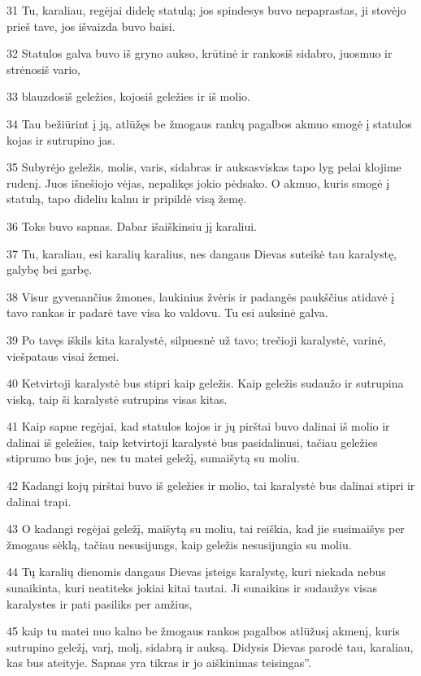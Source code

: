 \par 31 Tu, karaliau, regėjai didelę statulą; jos spindesys buvo nepaprastas, ji stovėjo prieš tave, jos išvaizda buvo baisi. 
\par 32 Statulos galva buvo iš gryno aukso, krūtinė ir rankos­iš sidabro, juosmuo ir strėnos­iš vario, 
\par 33 blauzdos­iš geležies, kojos­iš geležies ir iš molio. 
\par 34 Tau bežiūrint į ją, atlūžęs be žmogaus rankų pagalbos akmuo smogė į statulos kojas ir sutrupino jas. 
\par 35 Subyrėjo geležis, molis, varis, sidabras ir auksas­viskas tapo lyg pelai klojime rudenį. Juos išnešiojo vėjas, nepalikęs jokio pėdsako. O akmuo, kuris smogė į statulą, tapo dideliu kalnu ir pripildė visą žemę. 
\par 36 Toks buvo sapnas. Dabar išaiškinsiu jį karaliui. 
\par 37 Tu, karaliau, esi karalių karalius, nes dangaus Dievas suteikė tau karalystę, galybę bei garbę. 
\par 38 Visur gyvenančius žmones, laukinius žvėris ir padangės paukščius atidavė į tavo rankas ir padarė tave visa ko valdovu. Tu esi auksinė galva. 
\par 39 Po tavęs iškils kita karalystė, silpnesnė už tavo; trečioji karalystė, varinė, viešpataus visai žemei. 
\par 40 Ketvirtoji karalystė bus stipri kaip geležis. Kaip geležis sudaužo ir sutrupina viską, taip ši karalystė sutrupins visas kitas. 
\par 41 Kaip sapne regėjai, kad statulos kojos ir jų pirštai buvo dalinai iš molio ir dalinai iš geležies, taip ketvirtoji karalystė bus pasidalinusi, tačiau geležies stiprumo bus joje, nes tu matei geležį, sumaišytą su moliu. 
\par 42 Kadangi kojų pirštai buvo iš geležies ir molio, tai karalystė bus dalinai stipri ir dalinai trapi. 
\par 43 O kadangi regėjai geležį, maišytą su moliu, tai reiškia, kad jie susimaišys per žmogaus sėklą, tačiau nesusijungs, kaip geležis nesusijungia su moliu. 
\par 44 Tų karalių dienomis dangaus Dievas įsteigs karalystę, kuri niekada nebus sunaikinta, kuri neatiteks jokiai kitai tautai. Ji sunaikins ir sudaužys visas karalystes ir pati pasiliks per amžius, 
\par 45 kaip tu matei nuo kalno be žmogaus rankos pagalbos atlūžusį akmenį, kuris sutrupino geležį, varį, molį, sidabrą ir auksą. Didysis Dievas parodė tau, karaliau, kas bus ateityje. Sapnas yra tikras ir jo aiškinimas teisingas”. 
